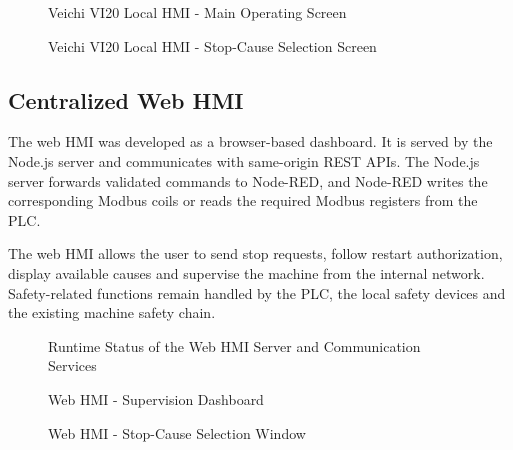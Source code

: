 \begin{figure}[H]
\centering
{}
\caption{Veichi VI20 Local HMI - Main Operating Screen}
\label{fig:chapter4-8}
\end{figure}

\begin{figure}[H]
\centering
{}
\caption{Veichi VI20 Local HMI - Stop-Cause Selection Screen}
\label{fig:chapter4-9}
\end{figure}

\subsection{Centralized Web HMI}
The web HMI was developed as a browser-based dashboard. It is served by the Node.js server and communicates with same-origin REST APIs. The Node.js server forwards validated commands to Node-RED, and Node-RED writes the corresponding Modbus coils or reads the required Modbus registers from the PLC.

The web HMI allows the user to send stop requests, follow restart authorization, display available causes and supervise the machine from the internal network. Safety-related functions remain handled by the PLC, the local safety devices and the existing machine safety chain.

\begin{figure}[H]
\centering
{}
\caption{Runtime Status of the Web HMI Server and Communication Services}
\label{fig:chapter4-10}
\end{figure}

\begin{figure}[H]
\centering
{}
\caption{Web HMI - Supervision Dashboard}
\label{fig:chapter4-11}
\end{figure}

\begin{figure}[H]
\centering
{}
\caption{Web HMI - Stop-Cause Selection Window}
\label{fig:chapter4-12}
\end{figure}

